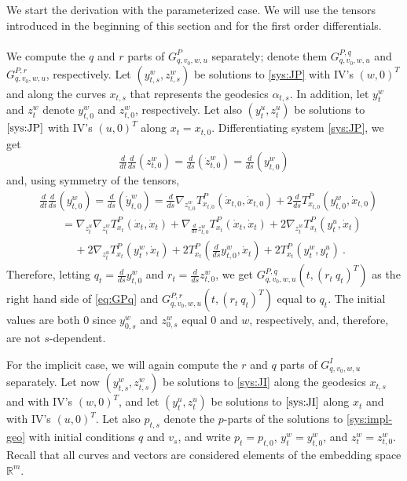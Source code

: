 \documentclass[final]{svjour3}
\newcommand{\RR}{\mathbb{R}}
\newcommand{\df}[2]{\tfrac{d}{d#2} #1}
\newcommand{\sdf}[2]{\scriptscriptstyle\frac{d}{d#2} #1}
\begin{document}
We start the derivation with the parameterized
case. We will use the tensors introduced in the beginning of this section
and for the first order differentials.
\\\ \\
    We compute the $q$ and $r$
    parts of $G_{q,v_0,w,u}^P$ separately; denote them $G_{q,v_0,w,u}^{P,q}$ and 
    $G_{q,v_0,w,u}^{P,r}$, respectively. Let $(y_{t,s}^w,z_{t,s}^w)$ be solutions to 
    \eqref{sys:JP} with IV's
    $(w,0)^T$ and along the curves $x_{t,s}$ that represents the geodesics
    $\alpha_{t,s}$. In addition, let $y_t^w$ and $z_t^w$
    denote $y_{t,0}^w$ and $z_{t,0}^w$, respectively. Let also $(y_t^u,z_t^u)$ be
    solutions to $\eqref{sys:JP}$ with IV's $(u,0)^T$ along $x_t=x_{t,0}$.
    Differentiating system \eqref{sys:JP}, we get
        $$\df{\df{(z_{t,0}^w)}{s}}{t}
        =
        \df{(\dot{z}_{t,0}^w)}{s}
        =\df{(y_{t,0}^w)}{s}$$
    and, using symmetry of the tensors,
    \begin{equation}
    \begin{split}
        &\df{\df{(y_{t,0}^w)}{s}}{t}
        =
        \df{(\dot{y}_{t,0}^w)}{s}
        =
        \df{\nabla_{z_{t,0}^w}T_{x_{t,0}}^P(\dot{x}_{t,0},\dot{x}_{t,0})}{s}
        +2\df{T_{x_{t,0}}^P(y_{t,0}^w,\dot{x}_{t,0})}{s}
        \\
        &\qquad
        =
        \nabla_{z_t^u}\nabla_{z_{t}^w}T_{x_t}^P(\dot{x}_{t},\dot{x}_{t})
        +\nabla_{\sdf{z_{t,0}^w}{s}}T_{x_{t}}^P(\dot{x}_{t},\dot{x}_{t})
        +2\nabla_{z_{t}^w}T_{x_{t}}^P(y_t^u,\dot{x}_{t})
        \\
        &\qquad\quad\,
        +2\nabla_{z_t^u}T_{x_t}^P(y_{t}^w,\dot{x}_{t})
        +2T_{x_t}^P(\df{y_{t,0}^w}{s},\dot{x}_{t})
        +2T_{x_t}^P(y_{t}^w,y_t^u)
        \ .
    \end{split}
    \label{eq:GPq}
    \end{equation}
    Therefore, letting $q_t=\df{y_{t,0}^w}{s}$ and $r_t=\df{z_{t,0}^w}{s}$, we get
    $G_{q,v_0,w,u}^{P,q}(t,(r_t\ q_t)^T)$ 
    as the right hand side of \eqref{eq:GPq}
    and $G_{q,v_0,w,u}^{P,r}(t,(r_t\ q_t)^T)$ equal to $q_t$.
    The initial values are both $0$ since $y_{0,s}^w$ and
    $z_{0,s}^w$ equal $0$ and $w$, respectively, and, therefore, are not $s$-dependent.
    
    For the implicit case, we will again compute the $r$ and $q$
    parts of $G_{q,v_0,w,u}^I$ separately. Let now $(y_{t,s}^w,z_{t,s}^w)$ 
    be solutions to \eqref{sys:JI} along the geodesics $x_{t,s}$ and with IV's
    $(w,0)^T$, and let $(y_t^u,z_t^u)$ be
    solutions to $\eqref{sys:JI}$ along $x_t$ and with IV's $(u,0)^T$.
    Let also $p_{t,s}$ denote the $p$-parts of the solutions to \eqref{sys:impl-geo} with
    initial conditions $q$ and $v_s$, and write $p_t=p_{t,0}$, $y_t^w=y_{t,0}^w$,
    and $z_t^w=z_{t,0}^w$. Recall that all curves and vectors are considered
    elements of the embedding space $\RR^m$.
\end{document}
